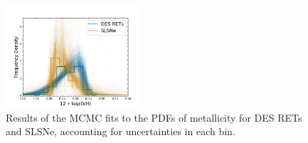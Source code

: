 \documentclass[fleqn,usenatbib,]{mnras}
\begin{document}
\begin{figure}
\includegraphics[width=0.45\textwidth]{mc_figs/rets_p16_OH_histfit_final.png}
\caption{Results of the MCMC fits to the PDFs of metallicity for DES RETs and SLSNe, accounting for uncertainties in each bin.
\label{fig:histfit_oh_p16}}
\end{figure}
\onecolumn


\bsp	%
\label{lastpage}
\end{document}
